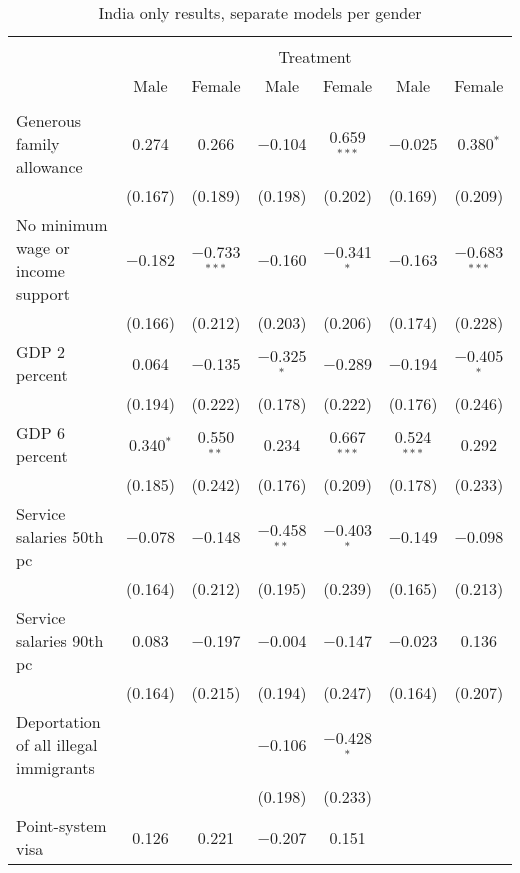 
\begin{sidewaystable}[!htbp] \centering 
  \caption{India only results, separate models per gender} 
  \label{tab:india_gender} 
\begin{tabular}{@{\extracolsep{5pt}}lcccccc} 
\\[-1.8ex]\hline 
\hline \\[-1.8ex] 
 & \multicolumn{6}{c}{Treatment} \\ 
\cline{2-7} 
 & Male & Female & Male & Female & Male & Female \\ 
\hline \\[-1.8ex] 
 Generous family allowance & 0.274 & 0.266 & $-$0.104 & 0.659$^{***}$ & $-$0.025 & 0.380$^{*}$ \\ 
  & (0.167) & (0.189) & (0.198) & (0.202) & (0.169) & (0.209) \\ 
  No minimum wage or income support & $-$0.182 & $-$0.733$^{***}$ & $-$0.160 & $-$0.341$^{*}$ & $-$0.163 & $-$0.683$^{***}$ \\ 
  & (0.166) & (0.212) & (0.203) & (0.206) & (0.174) & (0.228) \\ 
  GDP 2 percent & 0.064 & $-$0.135 & $-$0.325$^{*}$ & $-$0.289 & $-$0.194 & $-$0.405$^{*}$ \\ 
  & (0.194) & (0.222) & (0.178) & (0.222) & (0.176) & (0.246) \\ 
  GDP 6 percent & 0.340$^{*}$ & 0.550$^{**}$ & 0.234 & 0.667$^{***}$ & 0.524$^{***}$ & 0.292 \\ 
  & (0.185) & (0.242) & (0.176) & (0.209) & (0.178) & (0.233) \\ 
  Service salaries 50th pc & $-$0.078 & $-$0.148 & $-$0.458$^{**}$ & $-$0.403$^{*}$ & $-$0.149 & $-$0.098 \\ 
  & (0.164) & (0.212) & (0.195) & (0.239) & (0.165) & (0.213) \\ 
  Service salaries 90th pc & 0.083 & $-$0.197 & $-$0.004 & $-$0.147 & $-$0.023 & 0.136 \\ 
  & (0.164) & (0.215) & (0.194) & (0.247) & (0.164) & (0.207) \\ 
  Deportation of all illegal immigrants &  &  & $-$0.106 & $-$0.428$^{*}$ &  &  \\ 
  &  &  & (0.198) & (0.233) &  &  \\ 
  Point-system visa & 0.126 & 0.221 & $-$0.207 & 0.151 &  &  \\ 

\end{tabular}
\end{sidewaystable}
